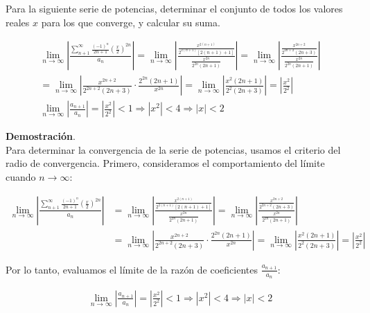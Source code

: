 \documentclass{article}
\begin{document}
    Para la siguiente serie de potencias, determinar el conjunto de todos los valores reales $x$ para los que converge, y calcular su suma.

    $$
    \begin{gathered}
    \lim _{n \rightarrow \infty}\left|\frac{\sum_{n+1}^{\infty} \frac{(-1)^{n}}{2 n+1}\left(\frac{x}{2}\right)^{2 n}}{a_{n}}\right|=\lim _{n \rightarrow \infty}\left|\frac{\frac{x^{2(n+1)}}{2^{2(n+1)}[2(n+1)+1]}}{\frac{x^{2 n}}{2^{2 n}(2 n+1)}}\right|=\lim _{n \rightarrow \infty}\left|\frac{\frac{x^{2 n+2}}{2^{2 n+2}(2 n+3)}}{\frac{x^{2 n}}{2^{2 n}(2 n+1)}}\right| \\
    =\lim _{n \rightarrow \infty}\left|\frac{x^{2 n+2}}{2^{2 n+2}(2 n+3)} \cdot \frac{2^{2 n}(2 n+1)}{x^{2 n}}\right|=\lim _{n \rightarrow \infty}\left|\frac{x^{2}(2 n+1)}{2^{2}(2 n+3)}\right|=\left|\frac{x^{2}}{2^{2}}\right| \\
    \lim _{n \rightarrow \infty}\left|\frac{a_{n+1}}{a_{n}}\right|=\left|\frac{x^{2}}{2^{2}}\right|<1 \Rightarrow\left|x^{2}\right|<4 \Rightarrow|x|<2
    \end{gathered}
    $$

    \textbf{Demostración}.\\

    Para determinar la convergencia de la serie de potencias, usamos el criterio del radio de convergencia. Primero, consideramos el comportamiento del límite cuando \( n \rightarrow \infty \):

    \begin{align*}
    \lim _{n \rightarrow \infty}\left|\frac{\sum_{n+1}^{\infty} \frac{(-1)^{n}}{2 n+1}\left(\frac{x}{2}\right)^{2 n}}{a_{n}}\right|
    &=\lim _{n \rightarrow \infty}\left|\frac{\frac{x^{2(n+1)}}{2^{2(n+1)}[2(n+1)+1]}}{\frac{x^{2 n}}{2^{2 n}(2 n+1)}}\right|
    =\lim _{n \rightarrow \infty}\left|\frac{\frac{x^{2 n+2}}{2^{2 n+2}(2 n+3)}}{\frac{x^{2 n}}{2^{2 n}(2 n+1)}}\right| \\
    &=\lim _{n \rightarrow \infty}\left|\frac{x^{2 n+2}}{2^{2 n+2}(2 n+3)} \cdot \frac{2^{2 n}(2 n+1)}{x^{2 n}}\right|
    =\lim _{n \rightarrow \infty}\left|\frac{x^{2}(2 n+1)}{2^{2}(2 n+3)}\right|
    =\left|\frac{x^{2}}{2^{2}}\right|
    \end{align*}

    Por lo tanto, evaluamos el límite de la razón de coeficientes \( \frac{a_{n+1}}{a_{n}} \):

    \begin{align*}
    \lim _{n \rightarrow \infty}\left|\frac{a_{n+1}}{a_{n}}\right|
    =\left|\frac{x^{2}}{2^{2}}\right|<1 \Rightarrow\left|x^{2}\right|<4 \Rightarrow|x|<2
    \end{align*}
\end{document}
